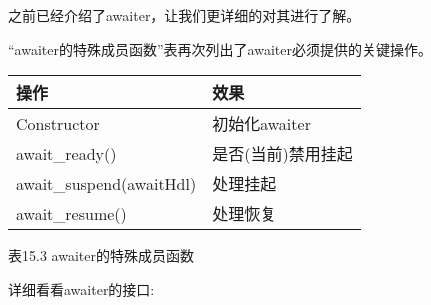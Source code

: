 
之前已经介绍了awaiter，让我们更详细的对其进行了解。


“awaiter的特殊成员函数”表再次列出了awaiter必须提供的关键操作。

\begin{longtable}[c]{|l|l|}
\hline
\textbf{操作}                & \textbf{效果}                                           \\ \hline
\endfirsthead
%
\endhead
%
Constructor              & 初始化awaiter                          \\ \hline
await\_ready()           & 是否(当前)禁用挂起 \\ \hline
await\_suspend(awaitHdl) & 处理挂起                                \\ \hline
await\_resume()          & 处理恢复                               \\ \hline
\end{longtable}

\begin{center}
表15.3 awaiter的特殊成员函数
\end{center}

详细看看awaiter的接口:

